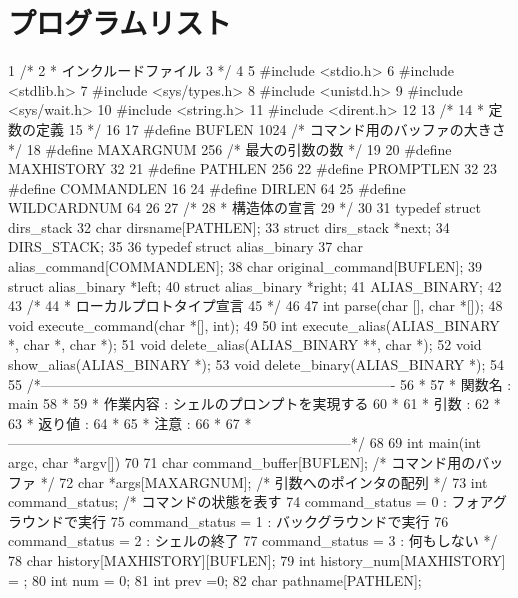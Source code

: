 \documentclass{procreport}
\begin{document}
\section{プログラムリスト}
\begin{verbatimtab}
     1	/*
     2	 *  インクルードファイル
     3	 */
     4	
     5	#include <stdio.h>
     6	#include <stdlib.h>
     7	#include <sys/types.h>
     8	#include <unistd.h>
     9	#include <sys/wait.h>
    10	#include <string.h>
    11	#include <dirent.h>
    12	
    13	/*
    14	 *  定数の定義
    15	 */
    16	
    17	#define BUFLEN	1024	 /* コマンド用のバッファの大きさ */
    18	#define MAXARGNUM  256	 /* 最大の引数の数 */
    19	
    20	#define MAXHISTORY 32
    21	#define PATHLEN 256
    22	#define PROMPTLEN 32
    23	#define COMMANDLEN 16
    24	#define DIRLEN 64
    25	#define WILDCARDNUM 64
    26	
    27	/*
    28	 *	構造体の宣言
    29	 */
    30	
    31	typedef struct dirs_stack{
    32		char dirsname[PATHLEN];
    33		struct dirs_stack *next;
    34	} DIRS_STACK;
    35		
    36	typedef struct alias_binary{
    37		char alias_command[COMMANDLEN];
    38		char original_command[BUFLEN];
    39		struct alias_binary *left;
    40		struct alias_binary *right;
    41	} ALIAS_BINARY;
    42	
    43	/*
    44	 *  ローカルプロトタイプ宣言
    45	 */
    46	
    47	int parse(char [], char *[]);
    48	void execute_command(char *[], int);
    49	
    50	int execute_alias(ALIAS_BINARY *, char *, char *);
    51	void delete_alias(ALIAS_BINARY **, char *);
    52	void show_alias(ALIAS_BINARY *);
    53	void delete_binary(ALIAS_BINARY *);
    54	
    55	/*----------------------------------------------------------------------------
    56	 *
    57	 *  関数名   : main
    58	 *
    59	 *  作業内容 : シェルのプロンプトを実現する
    60	 *
    61	 *  引数	 :
    62	 *
    63	 *  返り値   :
    64	 *
    65	 *  注意	 :
    66	 *
    67	 *--------------------------------------------------------------------------*/
    68	
    69	int main(int argc, char *argv[])
    70	{
    71		char command_buffer[BUFLEN]; /* コマンド用のバッファ */
    72		char *args[MAXARGNUM];	   /* 引数へのポインタの配列 */
    73		int command_status;		  /* コマンドの状態を表す
    74										
command_status = 0 : フォアグラウンドで実行
    75										
command_status = 1 : バックグラウンドで実行
    76										
command_status = 2 : シェルの終了
    77										
command_status = 3 : 何もしない */
    78		char history[MAXHISTORY][BUFLEN];
    79		int history_num[MAXHISTORY] = {};
    80		int num = 0;
    81		int prev =0;
    82		char pathname[PATHLEN];
}
\end{verbatimtab}
\end{document}
